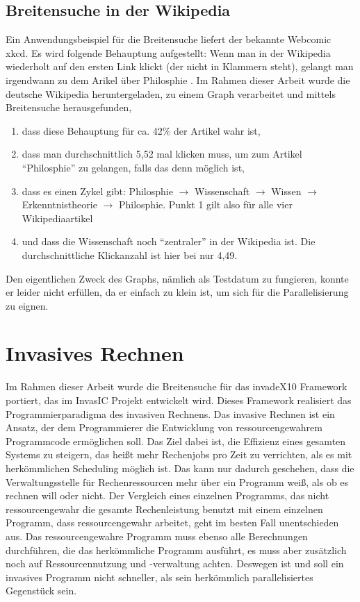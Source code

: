 \subsection{Breitensuche in der Wikipedia} %
\label{sub:wikipedia_und_die_philosophie}
Ein Anwendungsbeispiel für die Breitensuche liefert der bekannte Webcomic xkcd. Es wird folgende Behauptung aufgestellt: Wenn man in der Wikipedia wiederholt auf den ersten Link klickt (der nicht in Klammern steht), gelangt man irgendwann zu dem Arikel über Philosphie \cite{xkcd:Online}. Im Rahmen dieser Arbeit wurde die deutsche Wikipedia heruntergeladen, zu einem Graph verarbeitet und mittels Breitensuche herausgefunden,
\begin{enumerate}
	\item dass diese Behauptung für ca. 42\% der Artikel wahr ist,
	\item dass man durchschnittlich 5,52 mal klicken muss, um zum Artikel \enquote{Philosphie} zu gelangen, falls das denn möglich ist,
	\item dass es einen Zykel gibt: Philosphie $\rightarrow$ Wissenschaft $\rightarrow$ Wissen $\rightarrow$ Erkenntnistheorie $\rightarrow$ Philosphie. Punkt 1 gilt also für alle vier Wikipediaartikel
	\item und dass die Wissenschaft noch \enquote{zentraler} in der Wikipedia ist. Die durchschnittliche Klickanzahl ist hier bei nur 4,49.
\end{enumerate}
Den eigentlichen Zweck des Graphs, nämlich als Testdatum zu fungieren, konnte er leider nicht erfüllen, da er einfach zu klein ist, um sich für die Parallelisierung zu eignen.

\section{Invasives Rechnen} %
\label{sec:invasives_rechnen}
Im Rahmen dieser Arbeit wurde die Breitensuche für das invadeX10 Framework \cite{SWB-367212986} portiert, das im InvasIC Projekt entwickelt wird. Dieses Framework realisiert das Programmierparadigma des invasiven Rechnens. Das invasive Rechnen ist ein Ansatz, der dem Programmierer die Entwicklung von ressourcengewahrem Programmcode ermöglichen soll. Das Ziel dabei ist, die Effizienz eines gesamten Systems zu steigern, das heißt mehr Rechenjobs pro Zeit zu verrichten, als es mit herkömmlichen Scheduling möglich ist. Das kann nur dadurch geschehen, dass die Verwaltungsstelle für Rechenressourcen mehr über ein Programm weiß, als ob es rechnen will oder nicht. Der Vergleich eines einzelnen Programms, das nicht ressourcengewahr die gesamte Rechenleistung benutzt mit einem einzelnen Programm, dass ressourcengewahr arbeitet, geht im besten Fall unentschieden aus. Das ressourcengewahre Programm muss ebenso alle Berechnungen durchführen, die das herkömmliche Programm ausführt, es muss aber zusätzlich noch auf Ressourcennutzung und -verwaltung achten. Deswegen ist und soll ein invasives Programm nicht schneller, als sein herkömmlich parallelisiertes Gegenstück sein.

